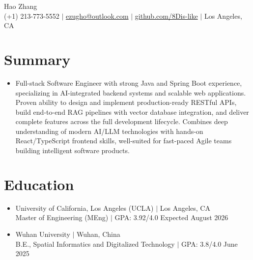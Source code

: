 \documentclass[letterpaper,11pt]{article}
\begin{document}
\begin{center}
    {\huge Hao Zhang} \\ \vspace{5pt}
    \small (+1) 213-773-5552 $|$ \href{mailto:ezugho@outlook.com}{ezugho@outlook.com} $|$
    \href{https://github.com/8Dis-like}{github.com/8Dis-like} $|$
    Los Angeles, CA
\end{center}

\section{Summary}
\begin{itemize}[leftmargin=0.15in, label={}]
    \item{
        Full-stack Software Engineer with strong Java and Spring Boot experience, specializing in AI-integrated backend systems and scalable web applications.
        Proven ability to design and implement production-ready RESTful APIs, build end-to-end RAG pipelines with vector database integration, and deliver complete features across the full development lifecycle.
        Combines deep understanding of modern AI/LLM technologies with hands-on React/TypeScript frontend skills, well-suited for fast-paced Agile teams building intelligent software products.
    }
\end{itemize}

\section{Education}
\begin{itemize}[leftmargin=0.15in, label={}]
    \item{
        University of California, Los Angeles (UCLA) $|$ Los Angeles, CA \\
        Master of Engineering (MEng) $|$ GPA: 3.92/4.0 \hfill Expected August 2026
    }
    \item{
        Wuhan University $|$ Wuhan, China \\
        B.E., Spatial Informatics and Digitalized Technology $|$ GPA: 3.8/4.0 \hfill June 2025
    }
\end{itemize}
\end{document}
